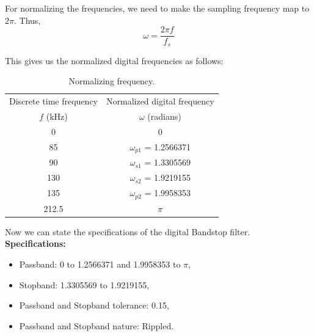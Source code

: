 \documentclass[12pt]{article}
\begin{document}
For normalizing the frequencies, we need to make the sampling frequency map to $2\pi$. Thus,
\[\omega = \frac{2\pi f}{f_s}\]

This gives us the normalized digital frequencies as follows:
\begin{table}[h]
    \centering
    \begin{tabular}{|c|c|}\hline
         Discrete time frequency&Normalized digital frequency\\
         $f$ (kHz)&$\omega$ (radians)\\\hline
         0&0\\\hline
         85&$\omega_{p1}$ = 1.2566371\\\hline
         90&$\omega_{s1}$ = 1.3305569\\\hline
         130&$\omega_{s2}$ = 1.9219155\\\hline
         135&$\omega_{p2}$ = 1.9958353\\\hline
         212.5&$\pi$\\\hline
    \end{tabular}
    \caption{Normalizing frequency.}
    \label{tab:1}
\end{table}

Now we can state the specifications of the digital Bandstop filter.
\newline
\hline
\vspace{10pt}
\textbf{Specifications:}
\begin{itemize}
    \item Passband: 0 to 1.2566371 and 1.9958353 to  $\pi$,
    \item Stopband: 1.3305569 to 1.9219155,
    \item Passband and Stopband tolerance: 0.15,
    \item Passband and Stopband nature: Rippled.
\end{itemize}
\hline
\end{document}
